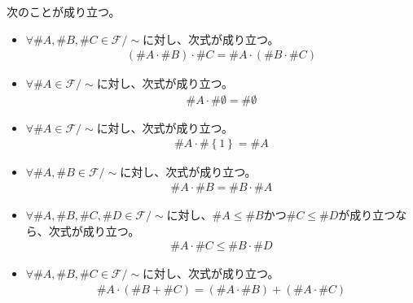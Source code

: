 \documentclass[dvipdfmx]{jsarticle}
\begin{document}
\begin{thm}\label{1.2.8.5}
次のことが成り立つ。
\begin{itemize}
\item
  $\forall\# A,\# B,\# C \in \mathcal{F} /\sim $に対し、次式が成り立つ。
\begin{align*}
\left( \# A \cdot \# B \right) \cdot \# C = \# A \cdot \left( \# B \cdot \# C \right)
\end{align*}
\item
  $\forall\# A \in \mathcal{F} /\sim $に対し、次式が成り立つ。
\begin{align*}
\# A \cdot \# \emptyset  = \# \emptyset 
\end{align*}
\item
  $\forall\# A \in \mathcal{F} /\sim $に対し、次式が成り立つ。
\begin{align*}
\# A \cdot \# \left\{ 1 \right\} = \# A
\end{align*}
\item
  $\forall\# A,\# B \in \mathcal{F} /\sim $に対し、次式が成り立つ。
\begin{align*}
\# A \cdot \# B = \# B \cdot \# A
\end{align*}
\item
  $\forall\# A,\# B,\# C,\# D \in \mathcal{F} /\sim $に対し、$\# A \leq \# B$かつ$\# C \leq \# D$が成り立つなら、次式が成り立つ。
\begin{align*}
\# A \cdot \# C \leq \# B \cdot \# D
\end{align*}
\item
  $\forall\# A,\# B,\# C \in \mathcal{F} /\sim $に対し、次式が成り立つ。
\begin{align*}
\# A \cdot \left( \# B + \# C \right) = \left( \# A \cdot \# B \right) + \left( \# A \cdot \# C \right)
\end{align*}
\end{itemize}
\end{thm}
\end{document}
